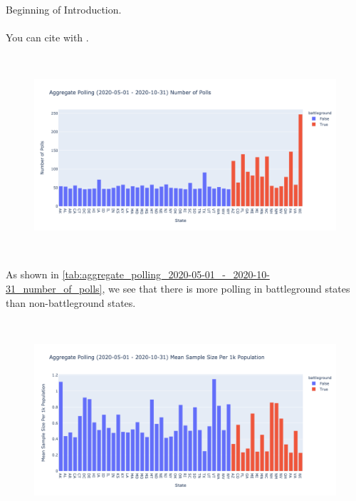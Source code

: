 Beginning of Introduction.\\~\\
You can cite with \cite{nadeau_2019}.

\begin{figure}[H]
    \centering
    \includegraphics[height=20em]{figures/aggregate_polling_2020-05-01_-_2020-10-31_number_of_polls.png}
    \label{fig:aggregate_polling_2020-05-01_-_2020-10-31_number_of_polls}
\end{figure}

\begin{table}[H]

    \label{tab:aggregate_polling_2020-05-01_-_2020-10-31_number_of_polls}
\end{table}

As shown in \ref{tab:aggregate_polling_2020-05-01_-_2020-10-31_number_of_polls}, we see that there is more polling in battleground states than non-battleground states.\\

\begin{figure}[H]
    \centering
    \includegraphics[height=20em]{figures/aggregate_polling_2020-05-01_-_2020-10-31_mean_sample_size_per_1k_population.png}
    \label{fig:aggregate_polling_2020-05-01_-_2020-10-31_mean_sample_size_per_1k_population}
\end{figure}

\begin{table}[H]

    \label{tab:aggregate_polling_2020-05-01_-_2020-10-31_mean_sample_size_per_1k_population}
\end{table}

